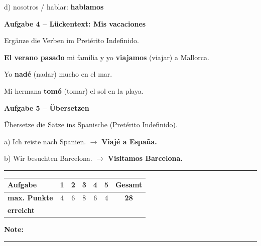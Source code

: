 \documentclass[11pt, a4paper]{article}
\newcommand{\fachfarbe}{spanisch}
\newcommand{\punktebox}[1]{\hfill\fbox{\small \_/#1}}
\newcommand{\luecke}[1]{\rule{#1}{0.4pt}}
\newcommand{\lsg}[1]{\textcolor{loesung}{\textbf{#1}}}
\newenvironment{aufgabe}[1]{%
    \needspace{5\baselineskip}%
    \nopagebreak[4]%
    \vspace{10pt}
    \noindent\textbf{\textcolor{\fachfarbe}{Aufgabe #1}}
    \nopagebreak[4]%
    \vspace{5pt}
    \nopagebreak[4]%
    \begin{list}{}{\leftmargin=0pt}
    \item[]
}{%
    \end{list}
}
\begin{document}
\vspace{0.8em}

\noindent
d) nosotros / hablar: \lsg{hablamos}

\vspace{15pt}


\begin{aufgabe}{4 -- Lückentext: Mis vacaciones}
Ergänze die Verben im Pretérito Indefinido. \punktebox{6}
\end{aufgabe}

\noindent
\textbf{El verano pasado} mi familia y yo \lsg{viajamos} (viajar) a Mallorca.

\vspace{0.8em}

\noindent
Yo \lsg{nadé} (nadar) mucho en el mar.

\vspace{0.8em}

\noindent
Mi hermana \lsg{tomó} (tomar) el sol en la playa.

\vspace{15pt}


\begin{aufgabe}{5 -- Übersetzen}
Übersetze die Sätze ins Spanische (Pretérito Indefinido). \punktebox{4}
\end{aufgabe}

\noindent
a) Ich reiste nach Spanien. $\rightarrow$ \lsg{Viajé a España.}

\vspace{0.8em}

\noindent
b) Wir besuchten Barcelona. $\rightarrow$ \lsg{Visitamos Barcelona.}


\vspace{25pt}
\hrule
\vspace{10pt}

\noindent
\begin{tabularx}{\textwidth}{|X|c|c|c|c|c||c|}
\hline
\textbf{Aufgabe} & 1 & 2 & 3 & 4 & 5 & \textbf{Gesamt} \\
\hline
\textbf{max. Punkte} & 4 & 6 & 8 & 6 & 4 & \textbf{28} \\
\hline
\textbf{erreicht} & & & & & & \\[0.8em]
\hline
\end{tabularx}

\vspace{10pt}

\begin{flushright}
\textbf{Note:} \luecke{2cm}
\end{flushright}
\end{document}
